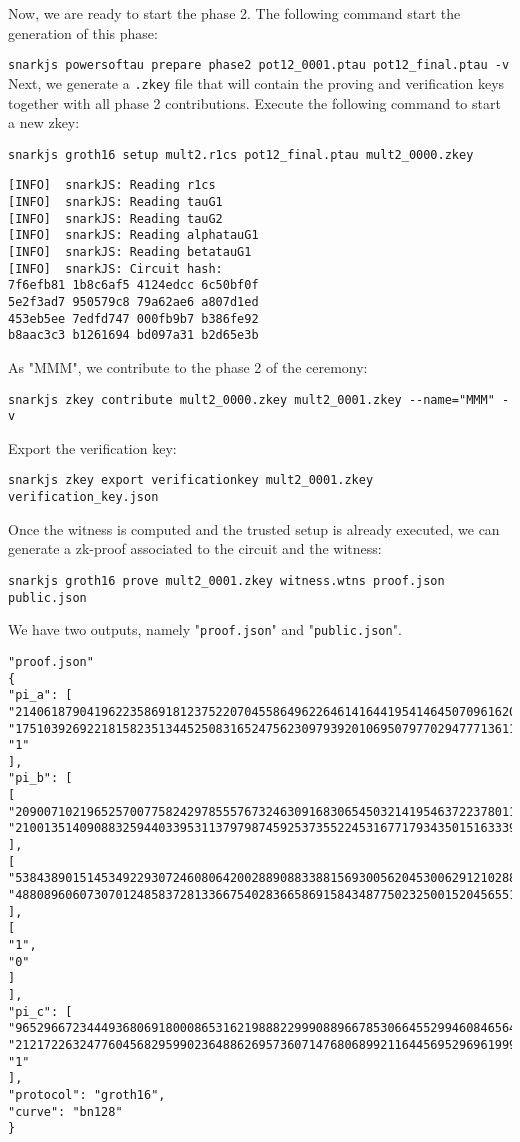 \documentclass[a4paper,oneside,12pt]{book}
\begin{document}
\noindent Now, we are ready to start the phase 2. The following command start the generation of this phase:


\verb|snarkjs powersoftau prepare phase2 pot12_0001.ptau pot12_final.ptau -v|
\newpage
\noindent Next, we generate a \verb|.zkey| file that will contain the proving and verification keys together with all phase 2 contributions. Execute the following command to start a new zkey:

\verb|snarkjs groth16 setup mult2.r1cs pot12_final.ptau mult2_0000.zkey|

\begin{verbatim}
[INFO]  snarkJS: Reading r1cs
[INFO]  snarkJS: Reading tauG1
[INFO]  snarkJS: Reading tauG2
[INFO]  snarkJS: Reading alphatauG1
[INFO]  snarkJS: Reading betatauG1
[INFO]  snarkJS: Circuit hash: 
7f6efb81 1b8c6af5 4124edcc 6c50bf0f
5e2f3ad7 950579c8 79a62ae6 a807d1ed
453eb5ee 7edfd747 000fb9b7 b386fe92
b8aac3c3 b1261694 bd097a31 b2d65e3b
\end{verbatim}

\noindent As "MMM", we contribute to the phase 2 of the ceremony:

\verb|snarkjs zkey contribute mult2_0000.zkey mult2_0001.zkey --name="MMM" -v|

\noindent Export the verification key:

\verb|snarkjs zkey export verificationkey mult2_0001.zkey verification_key.json|

\noindent Once the witness is computed and the trusted setup is already executed, we can generate a zk-proof associated to the circuit and the witness:

\verb|snarkjs groth16 prove mult2_0001.zkey witness.wtns proof.json public.json|

\noindent We have two outputs, namely "\verb|proof.json|" and "\verb|public.json|".
\newpage
\begin{verbatim}
"proof.json"
{
"pi_a": [
"21406187904196223586918123752207045586496226461416441954146450709616200888871",
"17510392692218158235134452508316524756230979392010695079770294777136117847241",
"1"
],
"pi_b": [
[
"2090071021965257007758242978555767324630916830654503214195463722378011152994",
"2100135140908832594403395311379798745925373552245316771793435015163339124462"
],
[
"5384389015145349229307246080642002889088338815693005620453006291210288346164",
"4880896060730701248583728133667540283665869158434877502325001520456551721539"
],
[
"1",
"0"
]
],
"pi_c": [
"9652966723444936806918000865316219888229990889667853066455299460846564791978",
"21217226324776045682959902364886269573607147680689921164456952969619999791404",
"1"
],
"protocol": "groth16",
"curve": "bn128"
}
\end{verbatim}
\end{document}
